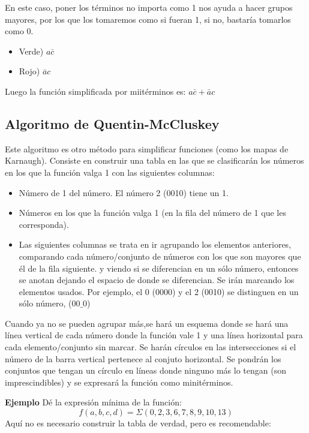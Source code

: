\documentclass[a4paper]{article}
\begin{document}
En este caso, poner los términos no importa como 1 nos ayuda a hacer grupos mayores, por los que los tomaremos como si fueran 1, si no, bastaría tomarlos como 0.
\begin{itemize}
\item Verde) $a\bar{c}$
\item Rojo) $\bar{a}c$
\end{itemize}
Luego la función simplificada por miitérminos es: $a\bar{c}+\bar{a}c$

\subsection{Algoritmo de Quentin-McCluskey}
Este algoritmo es otro método para simplificar funciones (como los mapas de Karnaugh). Consiste en construir una tabla en las que se clasificarán los números en los que la función valga 1 con las siguientes columnas:
\begin{itemize}
\item Número de 1 del número. El número 2 (0010) tiene un 1.
\item Números en los que la función valga 1 (en la fila del número de 1 que les corresponda).
\item Las siguientes columnas se trata en ir agrupando los elementos anteriores, comparando cada número/conjunto de números con los que son mayores que él de la fila siguiente. y viendo si se diferencian en un sólo número, entonces se anotan dejando el espacio de donde se diferencian. Se irán marcando los elementos usados. Por ejemplo, el 0 (0000) y el 2 (0010) se distinguen en un sólo número, ($00\_0$)
\end{itemize}
Cuando ya no se pueden agrupar más,se hará un esquema donde se hará una línea vertical de cada número donde la función vale 1 y una línea horizontal para cada elemento/conjunto sin marcar. Se harán círculos en las intersecciones si el número de la barra vertical pertenece al conjuto horizontal. Se pondrán los conjuntos que tengan un círculo en líneas donde ninguno más lo tengan (son imprescindibles) y se expresará la función como minitérminos.

\large{\textbf{Ejemplo}}
Dé la expresión mínima de la función:
$$f(a,b,c,d)=\Sigma(0,2,3,6,7,8,9,10,13)$$
Aquí no es necesario construir la tabla de verdad, pero es recomendable:
\end{document}
